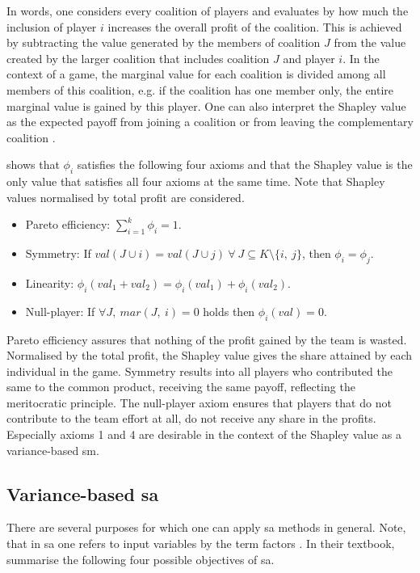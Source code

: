 In words, one considers every coalition of players and evaluates by how much the inclusion of player $i$ increases the overall profit of the coalition. This is achieved by subtracting the value generated by the members of coalition $J$ from the value created by the larger coalition that includes coalition $J$ and player $i$. In the context of a game, the marginal value for each coalition is divided among all members of this coalition, e.g. if the coalition has one member only, the entire marginal value is gained by this player. One can also interpret the Shapley value as the expected payoff from joining a coalition or from leaving the complementary coalition \citep{PRB20}.

\citet{S53} shows that $\phi_i$ satisfies the following four axioms and that the Shapley value is the only value that satisfies all four axioms at the same time. Note that Shapley values normalised by total profit are considered.

\begin{itemize}
    \item Pareto efficiency: $\sum_{i=1}^{k}\phi_i=1$.
	\item Symmetry: If $val(J \cup {i})=val(J \cup {j})\ \forall\ J \subseteq K \setminus{\{i,\ j\}}$, then $\phi_i = \phi_j$.
	\item Linearity: $\phi_i(val_1 + val_2)=\phi_i(val_1)+\phi_i(val_2)$.
	\item Null-player: If $\forall J,\ mar(J,\ i) = 0$ holds then $\phi_i(val) = 0$.
\end{itemize}

Pareto efficiency assures that nothing of the profit gained by the team is wasted. Normalised by the total profit, the Shapley value gives the share attained by each individual in the game. Symmetry results into all players who contributed the same to the common product, receiving the same payoff, reflecting the meritocratic principle. The null-player axiom ensures that players that do not contribute to the team effort at all, do not receive any share in the profits. Especially axioms 1 and 4 are desirable in the context of the Shapley value as a variance-based sm.

\subsection{Variance-based sa} \label{var_based_sa}

There are several purposes for which one can apply sa methods in general. Note, that in sa one refers to input variables by the term factors \citep{R21}. In their textbook, \citet{STC04} summarise the following four possible objectives of sa.

